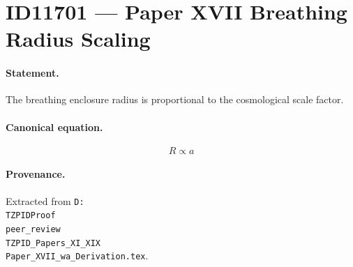 \section*{ID11701 --- Paper XVII Breathing Radius Scaling}

\paragraph{Statement.}
The breathing enclosure radius is proportional to the cosmological scale factor.

\paragraph{Canonical equation.}
\[
R\propto a
\]

\paragraph{Provenance.}
Extracted from \texttt{D:\\TZPIDProof\\peer\_review\\TZPID\_Papers\_XI\_XIX\\Paper\_XVII\_wa\_Derivation.tex}.
